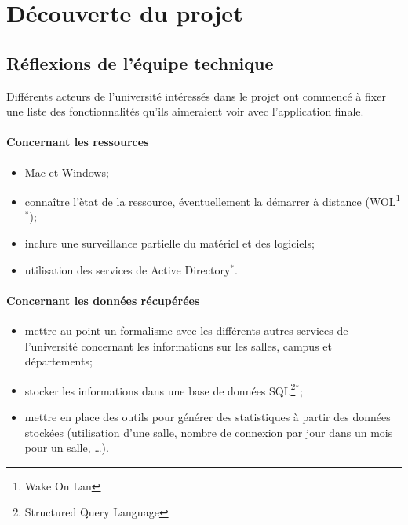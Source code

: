 \chapter{D\'ecouverte du projet}

\section{R\'eflexions de l'\'equipe technique}

Diff\'erents acteurs de l'universit\'e int\'eress\'es dans le projet \YuukouII{} ont commenc\'e \`a fixer une liste des fonctionnalit\'es qu'ils aimeraient voir avec l'application finale.

\subsubsection{Concernant les ressources}

\begin{itemize}
	\item Mac et Windows;
	\item conna\^itre l'\`etat de la ressource, \'eventuellement la d\'emarrer \`a distance (WOL\protect\footnote{Wake On Lan}$^*$);
	\item inclure une surveillance partielle du mat\'eriel et des logiciels;
	\item utilisation des services de Active Directory$^*$.

\end{itemize}

\subsubsection{Concernant les donn\'ees r\'ecup\'er\'ees}

\begin{itemize}
	\item mettre au point un formalisme avec les diff\'erents autres services de l'universit\'e concernant les informations sur les salles, campus et d\'epartements;
	\item stocker les informations dans une base de donn\'ees SQL\protect\footnote{Structured Query Language}$^*$;
	\item mettre en place des outils pour g\'en\'erer des statistiques \`a partir des donn\'ees stock\'ees (utilisation d'une salle, nombre de connexion par jour dans un mois pour un salle, \ldots).

\end{itemize}

